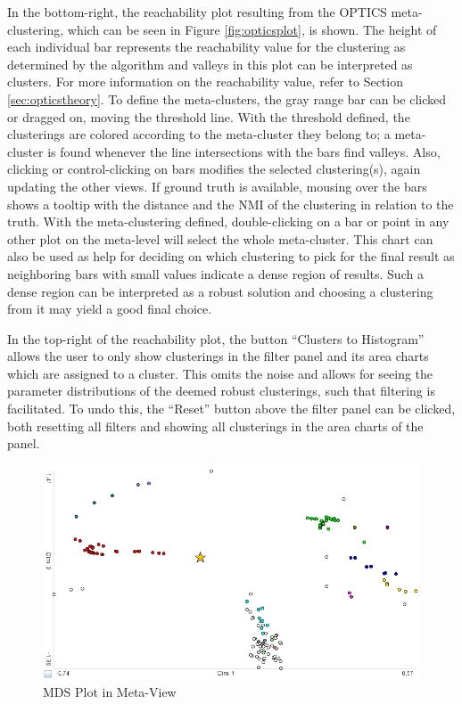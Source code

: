 \documentclass[
	a4paper,
	english,
	twoside,
	openright,               
	11pt                            
	]{report}
\begin{document}
In the bottom-right, the reachability plot resulting from the OPTICS meta-clustering, which can be seen in Figure \ref{fig:opticsplot}, is shown. The height of each individual bar represents the reachability value for the clustering as determined by the algorithm and valleys in this plot can be interpreted as clusters. For more information on the reachability value, refer to Section \ref{sec:opticstheory}. To define the meta-clusters, the gray range bar can be clicked or dragged on, moving the threshold line. With the threshold defined, the clusterings are colored according to the meta-cluster they belong to; a meta-cluster is found whenever the line intersections with the bars find valleys. Also, clicking or control-clicking on bars modifies the selected clustering(s), again updating the other views. If ground truth is available, mousing over the bars shows a tooltip with the distance and the NMI of the clustering in relation to the truth. With the meta-clustering defined, double-clicking on a bar or point in any other plot on the meta-level will select the whole meta-cluster. This chart can also be used as help for deciding on which clustering to pick for the final result as neighboring bars with small values indicate a dense region of results. Such a dense region can be interpreted as a robust solution and choosing a clustering from it may yield a good final choice. 

In the top-right of the reachability plot, the button ``Clusters to Histogram'' allows the user to only show clusterings in the filter panel and its area charts which are assigned to a cluster. This omits the noise and allows for seeing the parameter distributions of the deemed robust clusterings, such that filtering is facilitated. To undo this, the ``Reset'' button above the filter panel can be clicked, both resetting all filters and showing all clusterings in the area charts of the panel.

\begin{figure}[h]
	\centering
	\includegraphics[scale=.6]{mds-plot}
	\caption{MDS Plot in Meta-View}
	\label{fig:mdsplot}
\end{figure}
\end{document}
